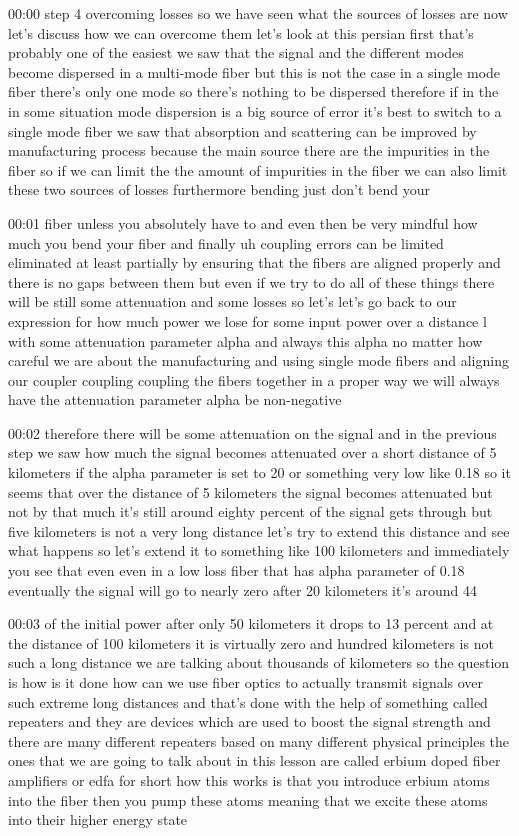 00:00
step 4 overcoming losses so we have seen what the sources of losses are
now let's discuss how we can overcome them
let's look at this persian first that's probably one of the easiest
we saw that the signal and the different modes become dispersed in a multi-mode
fiber but this is not the case in a single mode fiber there's only one mode
so there's nothing to be dispersed therefore if
in the in some situation mode dispersion is a big source of error
it's best to switch to a single mode fiber we saw that absorption and scattering
can be improved by manufacturing process because the main source there are the
impurities in the fiber so if we can limit the
the amount of impurities in the fiber we can also limit
these two sources of losses furthermore bending just don't bend your

00:01
fiber unless you absolutely have to and even then be very mindful how much
you bend your fiber and finally uh coupling errors can be limited eliminated
at least partially by ensuring that the fibers are aligned properly and there is
no gaps between them but even if we try to do all of these things
there will be still some attenuation and some losses
so let's let's go back to our expression for
how much power we lose for some input power
over a distance l with some attenuation parameter alpha
and always this alpha no matter how careful we are about the manufacturing
and using single mode fibers and aligning our coupler coupling
coupling the fibers together in a proper way we will always
have the attenuation parameter alpha be non-negative

00:02
therefore there will be some attenuation on the signal
and in the previous step we saw how much the signal becomes attenuated over a
short distance of 5 kilometers if the alpha parameter is set to 20
or something very low like 0.18 so it seems that over the distance of 5
kilometers the signal becomes attenuated but not by
that much it's still around eighty percent of the signal gets through
but five kilometers is not a very long distance let's try to extend this
distance and see what happens so let's extend it to
something like 100 kilometers and immediately you see that even
even in a low loss fiber that has alpha parameter of 0.18
eventually the signal will go to nearly zero after 20 kilometers it's around 44

00:03
of the initial power after only 50 kilometers it drops to 13 percent
and at the distance of 100 kilometers it is virtually zero
and hundred kilometers is not such a long distance we are talking about
thousands of kilometers so the question is how is it done how can we use fiber
optics to actually transmit signals over such extreme long distances
and that's done with the help of something called repeaters
and they are devices which are used to boost the
signal strength and there are many different repeaters
based on many different physical principles the ones that we are going to
talk about in this lesson are called erbium doped
fiber amplifiers or edfa for short how this works is that you introduce
erbium atoms into the fiber then you pump these atoms meaning
that we excite these atoms into their higher energy state

